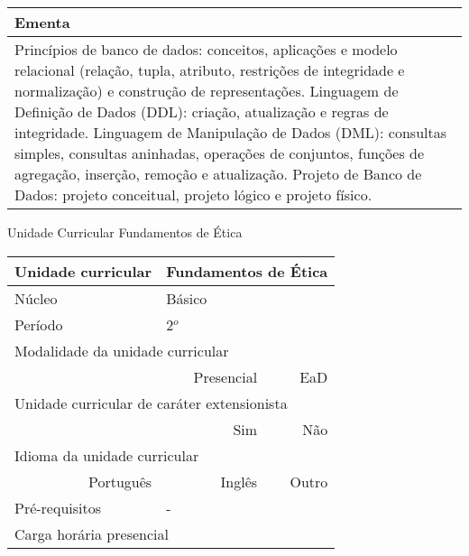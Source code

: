 \begin{quadro}[ht!]
\begin{tabular}{|p{3cm} p{2cm} p{3cm} p{2cm} p{3cm} p{2cm}|}
\multicolumn{6}{|p{15cm}|}{\cellcolor{blue1} Ementa} \\\hline
\hline\multicolumn{6}{|p{15cm}|}{\scriptsize Princípios de banco de dados: conceitos, aplicações e modelo relacional (relação, tupla, atributo, restrições de integridade e normalização) e construção de representações. Linguagem de Definição de Dados (DDL): criação, atualização e regras de integridade. Linguagem de Manipulação de Dados (DML): consultas simples, consultas aninhadas, operações de conjuntos, funções de agregação, inserção, remoção e atualização. Projeto de Banco de Dados: projeto conceitual, projeto lógico e projeto físico.}\\\hline
\hline
	\end{tabular}
\end{quadro}
\clearpage
\newpage\begin{quadro}[ht!]
  \centering\scriptsize
\caption{Unidade Curricular Fundamentos de Ética}
\label{ unit_10 }
\begin{tabular}{|p{3cm} p{2cm} p{3cm} p{2cm} p{3cm} p{2cm}|}\hline
\multicolumn{1}{|p{3cm}|}{\cellcolor{blue1} Unidade curricular} & \multicolumn{5}{p{9cm}|}{ Fundamentos de Ética }\\\hline
\multicolumn{1}{|p{3cm}|}{\cellcolor{blue1} Núcleo} & \multicolumn{5}{p{11.5cm}|}{ Básico }\\\hline
\multicolumn{1}{|p{3cm}|}{\cellcolor{blue1} Período} & \multicolumn{5}{p{9cm}|}{ 2$^o$ }\\\hline
\multicolumn{6}{|p{15cm}|}{\cellcolor{blue1} Modalidade da unidade curricular} \\\hline
\multicolumn{2}{|r}{		} &  \multicolumn{2}{r}{Presencial \XBox } & \multicolumn{2}{r|}{EaD \Square	} \\\hline
\multicolumn{6}{|p{15cm}|}{\cellcolor{blue1} Unidade curricular de caráter extensionista} \\\hline
\multicolumn{4}{|r}{			Sim \Square	} & \multicolumn{2}{r|}{	Não \XBox	}\\\hline
\multicolumn{6}{|p{15cm}|}{\cellcolor{blue1} Idioma da unidade curricular} \\ \hline
\multicolumn{2}{|r}{	Português \XBox	} &  \multicolumn{2}{r}{	Inglês \Square	} & \multicolumn{2}{r|}{	Outro \Square	} \\ \hline
\multicolumn{1}{|p{3cm}|}{\cellcolor{blue1} Pré-requisitos} & \multicolumn{5}{p{9cm}|}{ - }\\ \hline
\multicolumn{6}{|p{15cm}|}{\cellcolor{blue1} Carga horária presencial} \\ \hline

\end{tabular}
\end{quadro}

